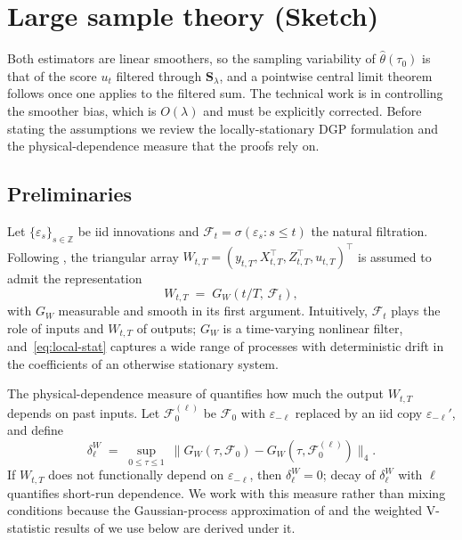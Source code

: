 \documentclass[12pt]{article}
\newcommand{\bfS}{\mathbf{S}}
\begin{document}
\section{Large sample theory (Sketch)}\label{sec:inference}

Both estimators are linear smoothers, so the sampling variability of $\hat\theta(\tau_0)$ is that of the score $u_t$ filtered through $\bfS_\lambda$, and a pointwise central limit theorem follows once one applies to the filtered sum. The technical work is in controlling the smoother bias, which is $O(\lambda)$ and must be explicitly corrected. Before stating the assumptions we review the locally-stationary DGP formulation and the physical-dependence measure that the proofs rely on.

\subsection{Preliminaries}\label{sec:inference-prelims}

Let $\{\varepsilon_s\}_{s \in \mathbb{Z}}$ be iid innovations and $\mathcal F_t = \sigma(\varepsilon_s : s \leq t)$ the natural filtration. Following \citet{ZhouWu2010}, the triangular array $W_{t,T} = (y_{t,T}, X_{t,T}^\top, Z_{t,T}^\top, u_{t,T})^\top$ is assumed to admit the representation
\begin{equation}\label{eq:local-stat}
  W_{t,T} \;=\; G_W(t/T,\, \mathcal F_t),
\end{equation}
with $G_W$ measurable and smooth in its first argument. Intuitively, $\mathcal F_t$ plays the role of inputs and $W_{t,T}$ of outputs; $G_W$ is a time-varying nonlinear filter, and~\eqref{eq:local-stat} captures a wide range of processes with deterministic drift in the coefficients of an otherwise stationary system.

The physical-dependence measure of \citet{Wu2005} quantifies how much the output $W_{t,T}$ depends on past inputs. Let $\mathcal F_0^{(\ell)}$ be $\mathcal F_0$ with $\varepsilon_{-\ell}$ replaced by an iid copy $\varepsilon_{-\ell}'$, and define
\begin{equation}\label{eq:phys-dep}
  \delta_\ell^W \;=\; \sup_{0 \leq \tau \leq 1}\ \bigl\| G_W(\tau, \mathcal F_0) - G_W(\tau, \mathcal F_0^{(\ell)}) \bigr\|_4.
\end{equation}
If $W_{t,T}$ does not functionally depend on $\varepsilon_{-\ell}$, then $\delta_\ell^W = 0$; decay of $\delta_\ell^W$ with $\ell$ quantifies short-run dependence. We work with this measure rather than mixing conditions because the Gaussian-process approximation of \citet{ZhouWu2010} and the weighted V-statistic results of \citet{Zhou2014} we use below are derived under it.
\end{document}
